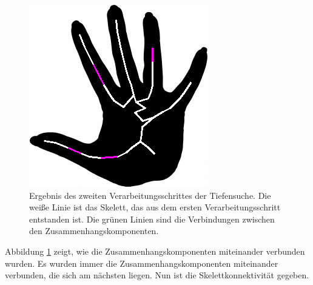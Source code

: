 \FloatBarrier
\begin{figure}[h]
\centering
\includegraphics[width=0.4\linewidth]{./fig/dfs-endergebnis-hand2.png}
\caption{Ergebnis des zweiten Verarbeitungsschrittes der Tiefensuche. Die weiße Linie ist das Skelett,
das aus dem ersten Verarbeitungsschritt entstanden ist. Die grünen
Linien sind die Verbindungen zwischen den Zusammenhangskomponenten.}
\label{fig:hand-DFS-endergebnis}
\end{figure}
\FloatBarrier
\noindent
Abbildung \ref{fig:hand-DFS-endergebnis} zeigt, wie die Zusammenhangskomponenten miteinander verbunden
wurden. Es wurden immer die Zusammenhangskomponenten miteinander verbunden, die sich am nächsten liegen.
Nun ist die Skelettkonnektivität gegeben.
